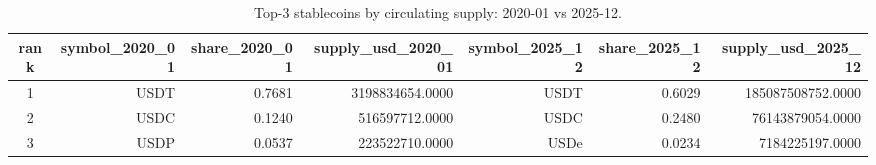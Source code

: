 \begin{table}
\caption{Top-3 stablecoins by circulating supply: 2020-01 vs 2025-12.}
\label{tbl:h3_top3_stablecoins}
\begin{tabular}{crrrrrr}
\toprule
rank & symbol_2020_01 & share_2020_01 & supply_usd_2020_01 & symbol_2025_12 & share_2025_12 & supply_usd_2025_12 \\
\midrule
1 & USDT & 0.7681 & 3198834654.0000 & USDT & 0.6029 & 185087508752.0000 \\
2 & USDC & 0.1240 & 516597712.0000 & USDC & 0.2480 & 76143879054.0000 \\
3 & USDP & 0.0537 & 223522710.0000 & USDe & 0.0234 & 7184225197.0000 \\
\bottomrule
\end{tabular}
\end{table}
